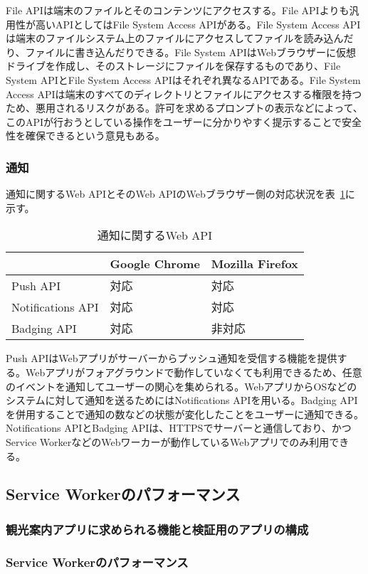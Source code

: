 File APIは端末のファイルとそのコンテンツにアクセスする。File APIよりも汎用性が高いAPIとしてはFile System Access APIがある。File System Access APIは端末のファイルシステム上のファイルにアクセスしてファイルを読み込んだり、ファイルに書き込んだりできる。File System APIはWebブラウザーに仮想ドライブを作成し、そのストレージにファイルを保存するものであり、File System APIとFile System Access APIはそれぞれ異なるAPIである。File System Access APIは端末のすべてのディレクトリとファイルにアクセスする権限を持つため、悪用されるリスクがある。許可を求めるプロンプトの表示などによって、このAPIが行おうとしている操作をユーザーに分かりやすく提示することで安全性を確保できるという意見もある。

\subsubsection{通知}\label{subsubsection:通知}
通知に関するWeb APIとそのWeb APIのWebブラウザー側の対応状況を表~\ref{table:通知に関するWeb API}に示す。
\begin{table}
  \centering
  \begin{tabular}{|p{20em}|p{10em}|p{10em}|}
    \hline
    & Google Chrome & Mozilla Firefox \\ \hline
    Push API & 対応 & 対応 \\ \hline
    Notifications API & 対応 & 対応 \\ \hline
    Badging API & 対応 & 非対応 \\ \hline
  \end{tabular}
  \caption{通知に関するWeb API}\label{table:通知に関するWeb API}
\end{table}

Push APIはWebアプリがサーバーからプッシュ通知を受信する機能を提供する。Webアプリがフォアグラウンドで動作していなくても利用できるため、任意のイベントを通知してユーザーの関心を集められる。WebアプリからOSなどのシステムに対して通知を送るためにはNotifications APIを用いる。Badging APIを併用することで通知の数などの状態が変化したことをユーザーに通知できる。Notifications APIとBadging APIは、HTTPSでサーバーと通信しており、かつService WorkerなどのWebワーカーが動作しているWebアプリでのみ利用できる。

\subsection{Service Workerのパフォーマンス}\label{subsection:Service Workerのパフォーマンス}
\subsubsection{観光案内アプリに求められる機能と検証用のアプリの構成}\label{subsubsection:観光案内アプリに求められる機能と検証用のアプリの構成}
\subsubsection{Service Workerのパフォーマンス}\label{subsubsection:Service Workerのパフォーマンス}
